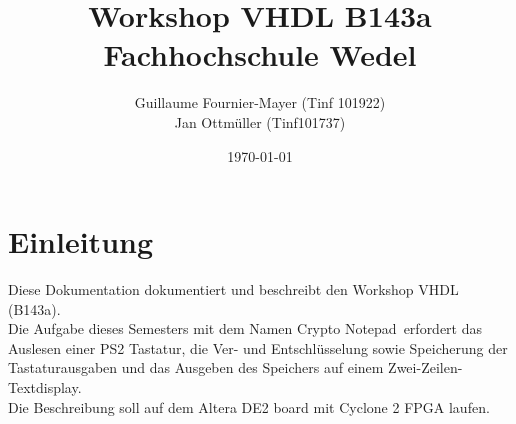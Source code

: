 \documentclass[a4paper,12pt]{report}
\newcommand{\au}{\glqq}
\newcommand{\ao}{\grqq\ } %
\begin{document}

	\title{Workshop VHDL B143a\\Fachhochschule Wedel}
	\author{Guillaume Fournier-Mayer (Tinf 101922) \\
		Jan Ottmüller (Tinf101737)}
	\date{\today}
	\maketitle

	\setlength{\cftbeforechapskip}{0.1em}
	\tableofcontents



\chapter{Einleitung}
	Diese Dokumentation dokumentiert und beschreibt den Workshop VHDL (B143a).\\
	Die Aufgabe dieses Semesters mit dem Namen \au Crypto Notepad\ao erfordert das Auslesen einer PS2 Tastatur, die Ver- und Entschlüsselung sowie Speicherung der Tastaturausgaben und das Ausgeben des Speichers auf einem Zwei-Zeilen-Textdisplay.\\
	Die Beschreibung soll auf dem Altera DE2 board mit Cyclone 2 FPGA laufen.  
\end{document}
